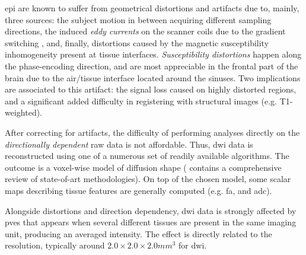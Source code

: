 \Gls{epi} are known to suffer from geometrical distortions and artifacts
  due to, mainly, three sources: the subject motion in between acquiring
  different sampling directions, the induced \emph{eddy currents} on the scanner
  coils due to the gradient switching \citep{brien_3d_2013}, and, finally,
  distortions caused by the magnetic susceptibility inhomogeneity
  present at tissue interfaces.
\emph{Susceptibility distortions} happen along the phase-encoding direction,
  and are most appreciable in the frontal part of the brain due to the air/tissue
  interface located around the sinuses.
Two implications are associated to this artifact: the signal loss caused on
  highly distorted regions, and a significant added difficulty in
  registering with structural images (e.g.
T1-weighted).

After correcting for artifacts, the difficulty of performing analyses directly
  on the \emph{directionally dependent} raw data is not affordable.
Thus, \gls{dwi} data is reconstructed using one of a numerous set of readily
  available algorithms.
The outcome is a voxel-wise model of diffusion shape (\citep{daducci_quantitative_2014}
  contains a comprehensive review of state-of-art methodologies).
On top of the chosen model, some scalar maps describing tissue features are generally
  computed (e.g.
\gls*{fa}, and \gls*{adc}).

Alongside distortions and direction dependency, \gls{dwi} data is strongly affected
  by \glspl{pve} \citep{alexander_analysis_2001} that appears when several different
  tissues are present in the same imaging unit, producing an averaged intensity.
The effect is directly related to the resolution, typically around
  $2.0\times2.0\times2.0mm^3$ for \gls{dwi}.


